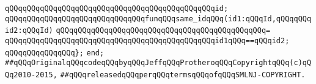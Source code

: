 \verb|qQQqqQQqqQQqqQQqqQQqqQQqqQQqqQQqqQQqqQQqqQQqqQQqid;|\newline
\newline
\verb|qQQqqQQqqQQqqQQqqQQqqQQqqQQqqQQqfunqQQqsame_idqQQq(id1:qQQqId,qQQqqQQqid2:qQQqId)|\newline
\verb|qQQqqQQqqQQqqQQqqQQqqQQqqQQqqQQqqQQqqQQqqQQqqQQq=|\newline
\verb|qQQqqQQqqQQqqQQqqQQqqQQqqQQqqQQqqQQqqQQqqQQqqQQqid1qQQq==qQQqid2;|\newline
\verb|qQQqqQQqqQQqqQQq};|\newline
\verb|end;|\newline
\newline
\verb|##qQQqOriginalqQQqcodeqQQqbyqQQqJeffqQQqProtheroqQQqCopyrightqQQq(c)qQQq2010-2015,|\newline
\verb|##qQQqreleasedqQQqperqQQqtermsqQQqofqQQqSMLNJ-COPYRIGHT.|\newline


